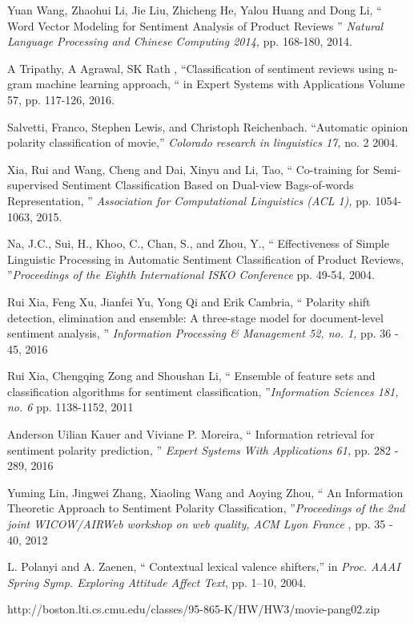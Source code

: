 \documentclass[oneside,a4paper,12pt]{pictreport}
\begin{document}
\begin{thebibliography}{20}
  Yuan Wang, Zhaohui Li, Jie Liu, Zhicheng He, Yalou Huang and Dong Li,
 `` Word Vector Modeling for Sentiment Analysis
of Product Reviews '' {\em Natural Language Processing and Chinese Computing 2014,} pp. 168-180, 2014.
 
  A Tripathy, A Agrawal, SK Rath , ``Classification of sentiment reviews using 
n-gram machine learning approach, `` in Expert Systems with Applications
Volume 57, pp. 117-126, 2016.

 Salvetti, Franco, Stephen Lewis, and Christoph Reichenbach. 
``Automatic opinion polarity classification of movie,'' {\em Colorado research in linguistics 17,} no. 2 2004.

Xia, Rui and Wang, Cheng and Dai, Xinyu and Li, Tao, 
`` Co-training for Semi-supervised Sentiment Classification Based on Dual-view Bags-of-words Representation, ''
  {\em Association for Computational Linguistics (ACL 1),} pp. 1054-1063, 2015.
  
Na, J.C., Sui, H., Khoo, C., Chan, S., and Zhou, Y., `` Effectiveness of Simple Linguistic 
Processing in Automatic 
Sentiment Classification of Product Reviews, ''{\em Proceedings 
of the Eighth International ISKO Conference
 } pp. 49-54, 2004.
 
 Rui Xia, Feng Xu, Jianfei Yu, Yong Qi and Erik Cambria, `` Polarity shift detection, 
 elimination and ensemble:
A three-stage model for document-level sentiment analysis, '' {\em  Information Processing \& Management 
52, no. 1, } pp. 36 - 45, 2016

Rui Xia, Chengqing Zong and Shoushan Li, `` Ensemble of feature sets and classification algorithms
for sentiment classification, ''{\em  Information Sciences 181, no. 6 } pp. 1138-1152, 2011

Anderson Uilian Kauer and Viviane P. Moreira, `` Information retrieval for sentiment polarity prediction, ''
{\em Expert Systems With Applications 61,} pp. 282 - 289, 2016

Yuming Lin, Jingwei Zhang, Xiaoling Wang and Aoying Zhou, `` An Information Theoretic 
Approach to Sentiment Polarity
Classification, ''{\em Proceedings of the 2nd joint WICOW/AIRWeb workshop on web quality, 
ACM Lyon France }, pp. 35 - 40, 2012


L. Polanyi and A. Zaenen, `` Contextual lexical valence shifters,'' in
{\em Proc. AAAI Spring Symp. Exploring Attitude Affect Text}, pp. 1–10, 2004.

http://boston.lti.cs.cmu.edu/classes/95-865-K/HW/HW3/movie-pang02.zip
\end{thebibliography}
\end{document}
